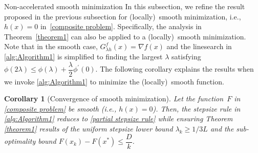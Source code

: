 \documentclass[11pt, a4paper, oneside, reqno]{amsart}
\makeatletter
\newtheorem{corollary}[theorem]{Corollary}
\def\subsection{\@startsection{subsection}{2}%
	\z@{.5\linespacing\@plus.7\linespacing}{.5\linespacing}%
	{\normalfont\large\bfseries}}
\makeatother
\begin{document}
\subsection{Non-accelerated smooth minimization}\label{Non-accelerated smooth minimization}
In this subsection, we refine the result proposed in the previous subsection for (locally)~smooth minimization, i.e., $h(x) = 0$ in~\eqref{composite problem}. Specifically, the analysis in Theorem~\ref{theorem1} can also be applied to a (locally)~smooth minimization. Note that in the smooth case, $G^{f}_{\lambda h}(x) = \nabla f(x)$ and the linesearch in \ref{alg:Algorithm1} is simplified to finding the largest $\lambda$ satisfying $\phi(2\lambda) \leq \phi(\lambda) + \dfrac{\lambda}{2}\phi^\prime(0)$. The following corollary explains the results when we invoke \ref{alg:Algorithm1} to minimize the (locally)~smooth function.
\begin{corollary}[Convergence of smooth minimization] \label{corollary-smooth-nonaccelerated}
Let the function~$F$ in \eqref{composite problem} be smooth (i.e., $h(x) = 0$). Then, the stepsize rule in \ref{alg:Algorithm1} reduces to \eqref{partial stepsize rule} while ensuring Theorem \ref{theorem1} results of the uniform stepsize lower bound $\lambda_k \geq {1}/{3L}$ and the sub-optimality bound $F(x_k) - F(x^*) \leq \dfrac{D}{k}$.
\end{corollary}
\end{document}
